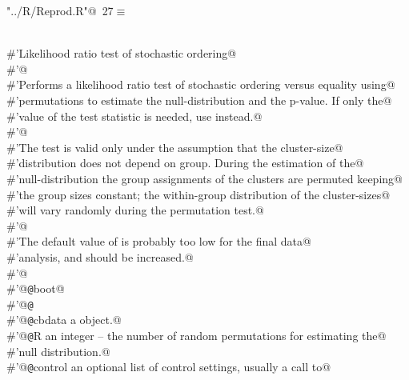 \documentclass[reqno]{amsart}
\renewcommand{\NWtarget}[2]{\hypertarget{#1}{#2}}
\begin{document}
\begin{flushleft} \small\label{scrap38}\raggedright\small
\NWtarget{nuweb27}{} \verb@"../R/Reprod.R"@\nobreak\ {\footnotesize {27}}$\equiv$
\vspace{-1ex}
\begin{list}{}{} \item
\mbox{}\verb@@\\
\mbox{}\verb@#'Likelihood ratio test of stochastic ordering@\\
\mbox{}\verb@#'@\\
\mbox{}\verb@#'Performs a likelihood ratio test of stochastic ordering versus equality using@\\
\mbox{}\verb@#'permutations to estimate the null-distribution and the p-value.  If only the@\\
\mbox{}\verb@#'value of the test statistic is needed, use  instead.@\\
\mbox{}\verb@#'@\\
\mbox{}\verb@#'The test is valid only under the assumption that the cluster-size@\\
\mbox{}\verb@#'distribution does not depend on group. During the estimation of the@\\
\mbox{}\verb@#'null-distribution the group assignments of the clusters are permuted keeping@\\
\mbox{}\verb@#'the group sizes constant; the within-group distribution of the cluster-sizes@\\
\mbox{}\verb@#'will vary randomly during the permutation test.@\\
\mbox{}\verb@#'@\\
\mbox{}\verb@#'The default value of  is probably too low for the final data@\\
\mbox{}\verb@#'analysis, and should be increased.@\\
\mbox{}\verb@#'@\\
\mbox{}\verb@#'@{\tt @}\verb@import boot@\\
\mbox{}\verb@#'@{\tt @}\verb@export@\\
\mbox{}\verb@#'@{\tt @}\verb@param cbdata a  object.@\\
\mbox{}\verb@#'@{\tt @}\verb@param R an integer -- the number of random permutations for estimating the@\\
\mbox{}\verb@#'null distribution.@\\
\mbox{}\verb@#'@{\tt @}\verb@param control an optional list of control settings, usually a call to@\\

\end{list}
\end{flushleft}
\end{document}
